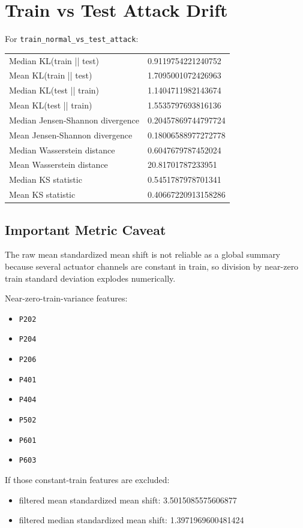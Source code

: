 \documentclass[11pt]{article}
\begin{document}
\section*{Train vs Test Attack Drift}
For \texttt{train\_normal\_vs\_test\_attack}:

\begin{longtable}{@{}ll@{}}
\toprule
Median KL(train || test) & 0.9119754221240752 \\
Mean KL(train || test) & 1.7095001072426963 \\
Median KL(test || train) & 1.1404711982143674 \\
Mean KL(test || train) & 1.5535797693816136 \\
Median Jensen-Shannon divergence & 0.20457869744797724 \\
Mean Jensen-Shannon divergence & 0.18006588977272778 \\
Median Wasserstein distance & 0.6047679787452024 \\
Mean Wasserstein distance & 20.81701787233951 \\
Median KS statistic & 0.5451787978701341 \\
Mean KS statistic & 0.40667220913158286 \\
\bottomrule
\end{longtable}

\subsection*{Important Metric Caveat}
The raw mean standardized mean shift is not reliable as a global summary because several actuator channels are constant in train, so division by near-zero train standard deviation explodes numerically.

Near-zero-train-variance features:
\begin{itemize}
\item \texttt{P202}
\item \texttt{P204}
\item \texttt{P206}
\item \texttt{P401}
\item \texttt{P404}
\item \texttt{P502}
\item \texttt{P601}
\item \texttt{P603}
\end{itemize}

If those constant-train features are excluded:
\begin{itemize}
\item filtered mean standardized mean shift: 3.5015085575606877
\item filtered median standardized mean shift: 1.3971969600481424
\end{itemize}
\end{document}
